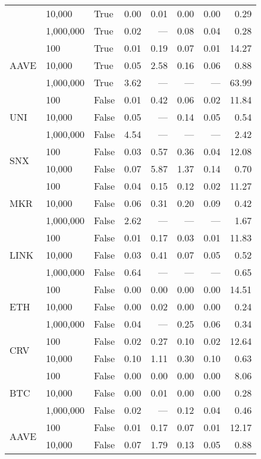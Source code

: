 \begin{tabular}{lllrrrrr}
     & 10,000 & True  &     0.00 &    0.01 &   0.00 & 0.00 &     0.29 \\
     & 1,000,000 & True  &     0.02 &     --- &   0.08 & 0.04 &     0.28 \\
\cline{1-8}
\multirow{3}{*}{AAVE} & 100 & True  &     0.01 &    0.19 &   0.07 & 0.01 &    14.27 \\
     & 10,000 & True  &     0.05 &    2.58 &   0.16 & 0.06 &     0.88 \\
     & 1,000,000 & True  &     3.62 &     --- &    --- &  --- &    63.99 \\
\cline{1-8}
\multirow{3}{*}{UNI} & 100 & False &     0.01 &    0.42 &   0.06 & 0.02 &    11.84 \\
     & 10,000 & False &     0.05 &     --- &   0.14 & 0.05 &     0.54 \\
     & 1,000,000 & False &     4.54 &     --- &    --- &  --- &     2.42 \\
\cline{1-8}
\multirow{2}{*}{SNX} & 100 & False &     0.03 &    0.57 &   0.36 & 0.04 &    12.08 \\
     & 10,000 & False &     0.07 &    5.87 &   1.37 & 0.14 &     0.70 \\
\cline{1-8}
\multirow{3}{*}{MKR} & 100 & False &     0.04 &    0.15 &   0.12 & 0.02 &    11.27 \\
     & 10,000 & False &     0.06 &    0.31 &   0.20 & 0.09 &     0.42 \\
     & 1,000,000 & False &     2.62 &     --- &    --- &  --- &     1.67 \\
\cline{1-8}
\multirow{3}{*}{LINK} & 100 & False &     0.01 &    0.17 &   0.03 & 0.01 &    11.83 \\
     & 10,000 & False &     0.03 &    0.41 &   0.07 & 0.05 &     0.52 \\
     & 1,000,000 & False &     0.64 &     --- &    --- &  --- &     0.65 \\
\cline{1-8}
\multirow{3}{*}{ETH} & 100 & False &     0.00 &    0.00 &   0.00 & 0.00 &    14.51 \\
     & 10,000 & False &     0.00 &    0.02 &   0.00 & 0.00 &     0.24 \\
     & 1,000,000 & False &     0.04 &     --- &   0.25 & 0.06 &     0.34 \\
\cline{1-8}
\multirow{2}{*}{CRV} & 100 & False &     0.02 &    0.27 &   0.10 & 0.02 &    12.64 \\
     & 10,000 & False &     0.10 &    1.11 &   0.30 & 0.10 &     0.63 \\
\cline{1-8}
\multirow{3}{*}{BTC} & 100 & False &     0.00 &    0.00 &   0.00 & 0.00 &     8.06 \\
     & 10,000 & False &     0.00 &    0.01 &   0.00 & 0.00 &     0.28 \\
     & 1,000,000 & False &     0.02 &     --- &   0.12 & 0.04 &     0.46 \\
\cline{1-8}
\multirow{2}{*}{AAVE} & 100 & False &     0.01 &    0.17 &   0.07 & 0.01 &    12.17 \\
     & 10,000 & False &     0.07 &    1.79 &   0.13 & 0.05 &     0.88 \\
\bottomrule
\end{tabular}
